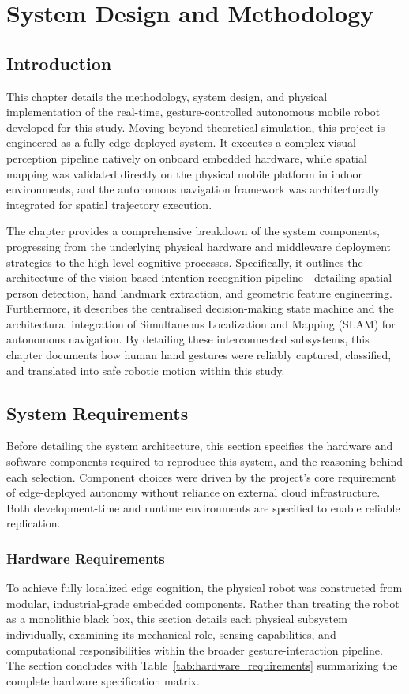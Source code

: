 \chapter{System Design and Methodology}

\section{Introduction}
This chapter details the methodology, system design, and physical implementation of the real-time, gesture-controlled autonomous mobile robot developed for this study. Moving beyond theoretical simulation, this project is engineered as a fully edge-deployed system. It executes a complex visual perception pipeline natively on onboard embedded hardware, while spatial mapping was validated directly on the physical mobile platform in indoor environments, and the autonomous navigation framework was architecturally integrated for spatial trajectory execution.

The chapter provides a comprehensive breakdown of the system components, progressing from the underlying physical hardware and middleware deployment strategies to the high-level cognitive processes. Specifically, it outlines the architecture of the vision-based intention recognition pipeline—detailing spatial person detection, hand landmark extraction, and geometric feature engineering. Furthermore, it describes the centralised decision-making state machine and the architectural integration of Simultaneous Localization and Mapping (SLAM) for autonomous navigation. By detailing these interconnected subsystems, this chapter documents how human hand gestures were reliably captured, classified, and translated into safe robotic motion within this study.

\section{System Requirements}
Before detailing the system architecture, this section specifies the hardware and software components required to reproduce this system, and the reasoning behind each selection. Component choices were driven by the project's core requirement of edge-deployed autonomy without reliance on external cloud infrastructure. Both development-time and runtime environments are specified to enable reliable replication.

\subsection{Hardware Requirements}
\label{sec:hardware_requirements}
To achieve fully localized edge cognition, the physical robot was constructed from modular, industrial-grade embedded components. Rather than treating the robot as a monolithic black box, this section details each physical subsystem individually, examining its mechanical role, sensing capabilities, and computational responsibilities within the broader gesture-interaction pipeline. The section concludes with Table~\ref{tab:hardware_requirements} summarizing the complete hardware specification matrix.

